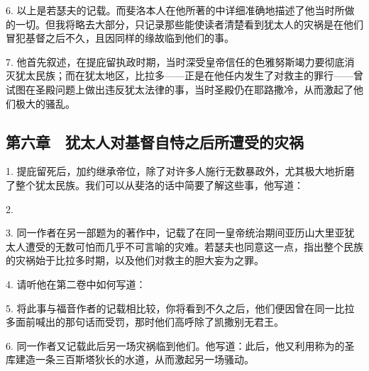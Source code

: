 6. 以上是若瑟夫的记载。而斐洛本人在他所著的中详细准确地描述了他当时所做的一切。但我将略去大部分，只记录那些能使读者清楚看到犹太人的灾祸是在他们冒犯基督之后不久，且因同样的缘故临到他们的事。\par

7. 他首先叙述，在提庇留执政时期，当时深受皇帝信任的色雅努斯竭力要彻底消灭犹太民族；而在犹太地区，比拉多——正是在他任内发生了对救主的罪行——曾试图在圣殿问题上做出违反犹太法律的事，当时圣殿仍在耶路撒冷，从而激起了他们极大的骚乱。\par


\subsection{第六章　犹太人对基督自恃之后所遭受的灾祸}

1. 提庇留死后，加约继承帝位，除了对许多人施行无数暴政外，尤其极大地折磨了整个犹太民族。我们可以从斐洛的话中简要了解这些事，他写道：\par

2. \par

3. 同一作者在另一部题为的著作中，记载了在同一皇帝统治期间亚历山大里亚犹太人遭受的无数可怕而几乎不可言喻的灾难。若瑟夫也同意这一点，指出整个民族的灾祸始于比拉多时期，以及他们对救主的胆大妄为之罪。\par

4. 请听他在第二卷中如何写道：\par

5. 将此事与福音作者的记载相比较，你将看到不久之后，他们便因曾在同一比拉多面前喊出的那句话而受罚，那时他们高呼除了凯撒别无君王。\par

6. 同一作者又记载此后另一场灾祸临到他们。他写道：此后，他又利用称为的圣库建造一条三百斯塔狄长的水道，从而激起另一场骚动。\par

